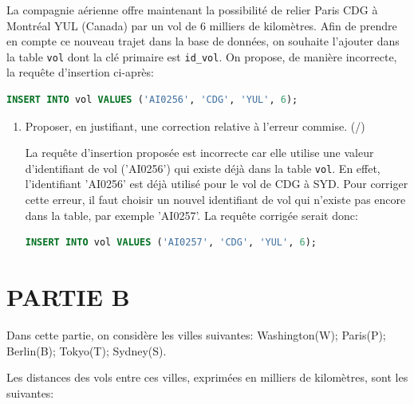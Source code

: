 \medskip

La compagnie aérienne offre maintenant la possibilité de relier Paris CDG à Montréal YUL (Canada) par un vol de 6 milliers de kilomètres. Afin de prendre en compte ce nouveau trajet dans la base de données, on souhaite l'ajouter dans la table \texttt{vol} dont la clé primaire est \texttt{id\_vol}. On propose, de manière incorrecte, la requête d'insertion ci-après:

\begin{lstlisting}[language=SQL]
INSERT INTO vol VALUES ('AI0256', 'CDG', 'YUL', 6);
\end{lstlisting}

\begin{enumerate}[resume=monDS]
    \item Proposer, en justifiant, une correction relative à l'erreur commise. (/)
\begin{blocvisible}[height=3.5]
    La requête d'insertion proposée est incorrecte car elle utilise une valeur d'identifiant de vol ('AI0256') qui existe déjà dans la table \texttt{vol}. En effet, l'identifiant 'AI0256' est déjà utilisé pour le vol de CDG à SYD. Pour corriger cette erreur, il faut choisir un nouvel identifiant de vol qui n'existe pas encore dans la table, par exemple 'AI0257'. La requête corrigée serait donc:
\begin{lstlisting}[language=SQL]    
INSERT INTO vol VALUES ('AI0257', 'CDG', 'YUL', 6);
\end{lstlisting}
\end{blocvisible}
\end{enumerate}

\pagebreak
\section*{PARTIE B}

Dans cette partie, on considère les villes suivantes: Washington(W); Paris(P); Berlin(B); Tokyo(T); Sydney(S).

Les distances des vols entre ces villes, exprimées en milliers de kilomètres, sont les suivantes:

\medskip


